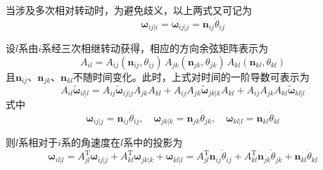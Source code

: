 当涉及多次相对转动时，为避免歧义，以上两式又可记为
\begin{equation}
\boldsymbol{\omega}_{ij|i} = \boldsymbol{\omega}_{ij|j} = \boldsymbol{n}_{ij}\dot{\theta}_{ij}
\end{equation}

设$l$系由$i$系经三次相继转动获得，相应的方向余弦矩阵表示为
\begin{equation}
A_{il} = A_{ij}(\boldsymbol{n}_{ij}, \theta_{ij})\,A_{jk}(\boldsymbol{n}_{jk}, \theta_{jk})\,A_{kl}(\boldsymbol{n}_{kl}, \theta_{kl})
\end{equation}
且$\boldsymbol{n}_{ij}$、$\boldsymbol{n}_{jk}$、$\boldsymbol{n}_{kl}$不随时间变化。此时，上式对时间的一阶导数可表示为
\begin{equation}
A_{il}\tilde{\boldsymbol{\omega}}_{il|l} = A_{ij}\tilde{\boldsymbol{\omega}}_{ij|j}A_{jk}A_{kl} + A_{ij}A_{jk}\tilde{\boldsymbol{\omega}}_{jk|k}A_{kl} + A_{ij}A_{jk}A_{kl}\tilde{\boldsymbol{\omega}}_{kl|l}
\end{equation}
式中
\begin{equation}
\boldsymbol{\omega}_{ij|j} = \boldsymbol{n}_{ij}\dot{\theta}_{ij}, \quad
\boldsymbol{\omega}_{jk|k} = \boldsymbol{n}_{jk}\dot{\theta}_{jk}, \quad
\boldsymbol{\omega}_{kl|l} = \boldsymbol{n}_{kl}\dot{\theta}_{kl}
\end{equation}

则$l$系相对于$i$系的角速度在$l$系中的投影为
\begin{equation}
\boldsymbol{\omega}_{il|l} = A_{jl}^{\mathrm{T}}\boldsymbol{\omega}_{ij|j} + A_{kl}^{\mathrm{T}}\boldsymbol{\omega}_{jk|k} + \boldsymbol{\omega}_{kl|l}
= A_{jl}^{\mathrm{T}}\boldsymbol{n}_{ij}\dot{\theta}_{ij} + A_{kl}^{\mathrm{T}}\boldsymbol{n}_{jk}\dot{\theta}_{jk} + \boldsymbol{n}_{kl}\dot{\theta}_{kl}
\label{eq:7.20}
\end{equation}
